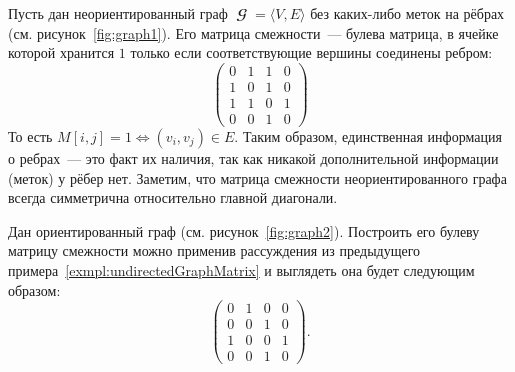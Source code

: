 \begin{marginfigure}
    \begin{center}
        \resizebox{\marginparwidth}{!}{}
    \end{center}
    \caption{Неориентированный граф}
    \label{fig:graph1}
\end{marginfigure}
\begin{example}
    \label{exmpl:undirectedGraphMatrix}
    Пусть дан неориентированный граф $\mbfscrG = \langle V, E\rangle$ без каких-либо меток на рёбрах (см. рисунок~\ref{fig:graph1}).
    Его матрица смежности~--- булева матрица, в ячейке которой хранится $1$ только если соответствующие вершины соединены ребром:
    \[
        \begin{pmatrix}
            0 & 1 & 1 & 0 \\
            1 & 0 & 1 & 0 \\
            1 & 1 & 0 & 1 \\
            0 & 0 & 1 & 0
        \end{pmatrix}
    \]
    То есть $M[i,j] = 1 \iff (v_i,v_j) \in E$.
    Таким образом, единственная информация о ребрах~--- это факт их наличия, так как никакой дополнительной информации (меток) у рёбер нет.
    Заметим, что матрица смежности неориентированного графа всегда симметрична относительно главной диагонали.
\end{example}

\begin{marginfigure}
    \begin{center}
        \resizebox{\marginparwidth}{!}{}
    \end{center}
    \caption{Ориентированный граф}
    \label{fig:graph2}
\end{marginfigure}
\begin{example}
    \label{exmpl:diGraph}
    Дан ориентированный граф (см. рисунок~\ref{fig:graph2}).
    Построить его булеву матрицу смежности можно применив рассуждения из предыдущего примера~\ref{exmpl:undirectedGraphMatrix} и выглядеть она будет следующим образом:
    \[
        \begin{pmatrix}
            0 & 1 & 0 & 0 \\
            0 & 0 & 1 & 0 \\
            1 & 0 & 0 & 1 \\
            0 & 0 & 1 & 0
        \end{pmatrix}.
    \]
\end{example}

